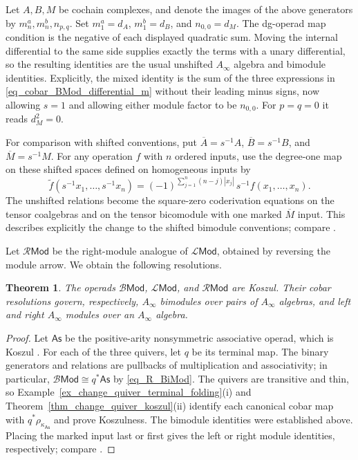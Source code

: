 \documentclass[11pt,letterpaper]{article}
\numberwithin{equation}{section}
\theoremstyle{plain}
\newtheorem{thm}{Theorem}[section]
\theoremstyle{definition}
\theoremstyle{remark}
\begin{document}
	Let $A,B,M$ be cochain complexes, and denote the images of the
above generators by $m_n^a,m_n^b,n_{p,q}$. Set
$m_1^a=d_A$, $m_1^b=d_B$, and $n_{0,0}=d_M$.
The dg-operad map condition is the negative of each displayed quadratic
sum. Moving the internal differential to the same side supplies exactly
the terms with a unary differential, so the resulting identities are the
usual unshifted $A_\infty$ algebra and bimodule identities. Explicitly,
the mixed identity is the sum of the three expressions in
\eqref{eq_cobar_BMod_differential_m} without their leading minus signs,
now allowing $s=1$ and allowing either module factor to be $n_{0,0}$.
For $p=q=0$ it reads $d_M^2=0$.

For comparison with shifted conventions, put $\overline A=s^{-1}A$,
$\overline B=s^{-1}B$, and $\overline M=s^{-1}M$. For any operation
$f$ with $n$ ordered inputs, use the degree-one map on these shifted
spaces defined on homogeneous inputs by
\begin{equation}\label{eq_bimodule_suspension_convention}
 \widetilde f(s^{-1}x_1,\ldots,s^{-1}x_n)
 =(-1)^{\sum_{j=1}^n(n-j)|x_j|}\,s^{-1}f(x_1,\ldots,x_n).
\end{equation}
The unshifted relations become the square-zero coderivation equations
on the tensor coalgebras and on the tensor bicomodule with one marked
$\overline M$ input. This describes explicitly the change to the shifted
bimodule conventions; compare \cite[\S 6.5]{Yuan_higher_operad_Fuk}.

Let $\mathscr R\mathsf{Mod}$ be the right-module analogue of
$\mathscr L\mathsf{Mod}$, obtained by reversing the module arrow.
We obtain the following resolutions.

\begin{thm}
\label{thm_Koszulness_BMod}
The operads $\mathscr B\mathsf{Mod}$, $\mathscr L\mathsf{Mod}$, and
$\mathscr R\mathsf{Mod}$ are Koszul. Their cobar resolutions govern,
respectively, $A_\infty$ bimodules over pairs of $A_\infty$ algebras,
and left and right $A_\infty$ modules over an $A_\infty$ algebra.
\end{thm}
\begin{proof}
Let $\mathsf{As}$ be the positive-arity nonsymmetric associative operad,
which is Koszul \cite[\S 9.1]{loday2012algebraic}. For each of the three
quivers, let $q$ be its terminal map. The binary generators and relations
are pullbacks of multiplication and associativity; in particular,
$\mathscr B\mathsf{Mod}\cong q^*\mathsf{As}$ by \eqref{eq_R_BiMod}.
The quivers are transitive and thin, so
Example~\ref{ex_change_quiver_terminal_folding}(i) and
Theorem~\ref{thm_change_quiver_koszul}(ii) identify each canonical cobar
map with $q^*\rho_{\kappa_{\mathsf{As}}}$ and prove Koszulness.
The bimodule identities were established above. Placing the marked
input last or first gives the left or right module identities, respectively; compare
\cite[\S 6.4]{Yuan_higher_operad_Fuk}.
\end{proof}
\end{document}
